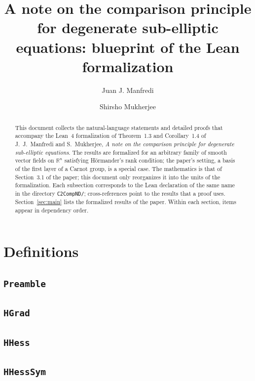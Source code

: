 \documentclass[11pt]{amsart}
\title[Blueprint of the Lean formalization]{A note on the comparison principle for degenerate sub-elliptic equations: blueprint of the Lean formalization}
\author{Juan J. Manfredi}
\author{Shirsho Mukherjee}
\theoremstyle{definition}
\begin{document}
\begin{abstract}
This document collects the natural-language statements and detailed proofs that accompany the Lean~4 formalization of Theorem~1.3 and Corollary~1.4 of J.~J.~Manfredi and S.~Mukherjee, \emph{A note on the comparison principle for degenerate sub-elliptic equations}.
The results are formalized for an arbitrary family of smooth vector fields on $\mathbb{R}^n$ satisfying H\"ormander's rank condition; the paper's setting, a basis of the first layer of a Carnot group, is a special case.
The mathematics is that of Section~3.1 of the paper; this document only reorganizes it into the units of the formalization.
Each subsection corresponds to the Lean declaration of the same name in the directory \texttt{C2CompND/}; cross-references point to the results that a proof uses.
Section~\ref{sec:main} lists the formalized results of the paper.
Within each section, items appear in dependency order.
\end{abstract}
\maketitle
\tableofcontents

\section{Definitions}
\subsection{\texorpdfstring{\texttt{Preamble}}{Preamble}}\label{node:Preamble}


\subsection{\texorpdfstring{\texttt{HGrad}}{HGrad}}\label{node:HGrad}


\subsection{\texorpdfstring{\texttt{HHess}}{HHess}}\label{node:HHess}


\subsection{\texorpdfstring{\texttt{HHessSym}}{HHessSym}}\label{node:HHessSym}

\end{document}
